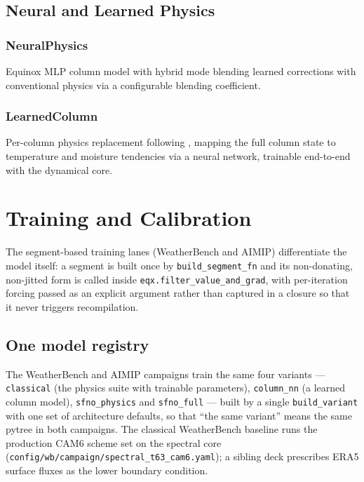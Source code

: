 \documentclass[11pt,a4paper]{article}
\begin{document}
\subsection{Neural and Learned Physics}

\subsubsection{NeuralPhysics}
Equinox MLP column model with hybrid mode blending learned corrections with conventional physics via a configurable blending coefficient.

\subsubsection{LearnedColumn}
Per-column physics replacement following \citet{Rasp2018}, mapping the full column state to temperature and moisture tendencies via a neural network, trainable end-to-end with the dynamical core.

\section{Training and Calibration}
\label{sec:training}

The segment-based training lanes (WeatherBench and AIMIP) differentiate the model itself: a segment is built once by \texttt{build\_segment\_fn} and its non-donating, non-jitted form is called inside \texttt{eqx.filter\_value\_and\_grad}, with per-iteration forcing passed as an explicit argument rather than captured in a closure so that it never triggers recompilation.

\subsection{One model registry}
The WeatherBench and AIMIP campaigns train the same four variants --- \texttt{classical} (the physics suite with trainable parameters), \texttt{column\_nn} (a learned column model), \texttt{sfno\_physics} and \texttt{sfno\_full} --- built by a single \texttt{build\_variant} with one set of architecture defaults, so that ``the same variant'' means the same pytree in both campaigns.  The classical WeatherBench baseline runs the production CAM6 scheme set on the spectral core (\texttt{config/wb/campaign/spectral\_t63\_cam6.yaml}); a sibling deck prescribes ERA5 surface fluxes as the lower boundary condition.
\end{document}
